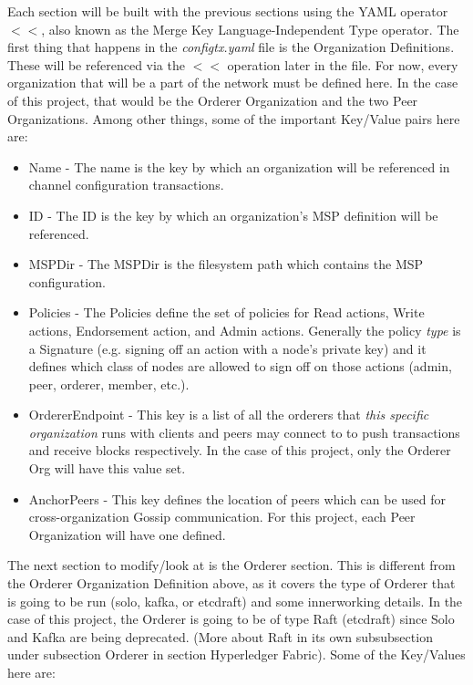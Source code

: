\begin{itemize}
					\hspace{10mm}Each section will be built with the previous sections using the YAML operator $<<$, also known as the Merge Key Language-Independent Type operator. The first thing that happens in the \textit{configtx.yaml} file is the Organization Definitions. These will be referenced via the $<<$ operation later in the file. For now, every organization that will be a part of the network must be defined here. In the case of this project, that would be the Orderer Organization and the two Peer Organizations. Among other things, some of the important Key/Value pairs here are:
						\begin{itemize}
							\item Name - The name is the key by which an organization will be referenced in channel configuration transactions.
							\item ID - The ID is the key by which an organization's MSP definition will be referenced.
							\item MSPDir - The MSPDir is the filesystem path which contains the MSP configuration.
							\item Policies - The Policies define the set of policies for Read actions, Write actions, Endorsement action, and Admin actions. Generally the policy \textit{type} is a Signature (e.g. signing off an action with a node's private key) and it defines which class of nodes are allowed to sign off on those actions (admin, peer, orderer, member, etc.).
							\item OrdererEndpoint - This key is a list of all the orderers that \textit{this specific organization} runs with clients and peers may connect to to push transactions and receive blocks respectively. In the case of this project, only the Orderer Org will have this value set.
							\item AnchorPeers - This key defines the location of peers which can be used for cross-organization Gossip communication. For this project, each Peer Organization will have one defined.
						\end{itemize}
							
					\hspace{10mm}The next section to modify/look at is the Orderer section. This is different from the Orderer Organization Definition above, as it covers the type of Orderer that is going to be run (solo, kafka, or etcdraft) and some innerworking details. In the case of this project, the Orderer is going to be of type Raft (etcdraft) since Solo and Kafka are being deprecated. (More about Raft in its own subsubsection under subsection Orderer in section Hyperledger Fabric). Some of the Key/Values here are:
					

\end{itemize}
